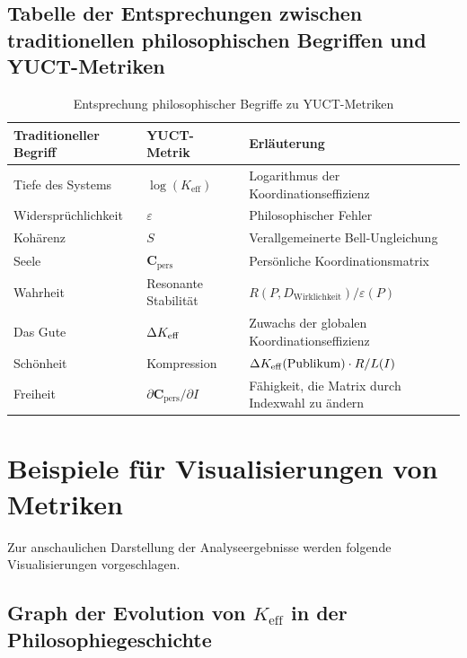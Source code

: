\documentclass[12pt,a4paper]{article}
\newcommand{\eps}{\varepsilon}
\newcommand{\Cpers}{\mathbf{C}_{\text{pers}}}
\begin{document}
	\subsection{Tabelle der Entsprechungen zwischen traditionellen philosophischen Begriffen und YUCT-Metriken}
	
	\begin{table}[H]
		\centering
		\caption{Entsprechung philosophischer Begriffe zu YUCT-Metriken}
		\label{tab:philosophy-metrics}
		\begin{tabular}{p{3.5cm}p{3.5cm}p{4cm}}
			\toprule
			\textbf{Traditioneller Begriff} & \textbf{YUCT-Metrik} & \textbf{Erläuterung} \\
			\midrule
			Tiefe des Systems & \(\log(K_{\mathrm{eff}})\) & Logarithmus der Koordinationseffizienz \\
			Widersprüchlichkeit & \(\eps\) & Philosophischer Fehler \\
			Kohärenz & \(S\) & Verallgemeinerte Bell-Ungleichung \\
			Seele & \(\Cpers\) & Persönliche Koordinationsmatrix \\
			Wahrheit & Resonante Stabilität & \(R(P, D_{\text{Wirklichkeit}}) / \eps(P)\) \\
			Das Gute & \(\Delta \Keff\) & Zuwachs der globalen Koordinationseffizienz \\
			Schönheit & Kompression & \( \Delta \Keff(\text{Publikum}) \cdot R / L(I) \) \\
			Freiheit & \(\partial \Cpers / \partial I\) & Fähigkeit, die Matrix durch Indexwahl zu ändern \\
			\bottomrule
		\end{tabular}
	\end{table}
	
	\section{Beispiele für Visualisierungen von Metriken}
	\label{sec:visualizations}
	
	Zur anschaulichen Darstellung der Analyseergebnisse werden folgende Visualisierungen vorgeschlagen.
	
	\subsection{Graph der Evolution von \(K_{\mathrm{eff}}\) in der Philosophiegeschichte}
	
\end{document}
